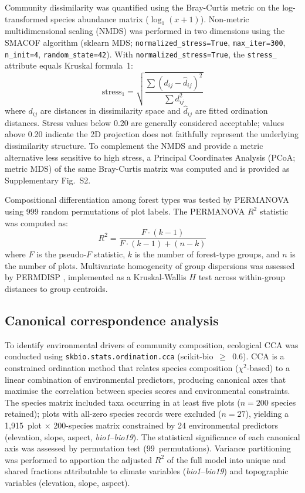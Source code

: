 \documentclass[review,12pt,a4paper]{elsarticle}
\begin{document}
Community dissimilarity was quantified using the Bray-Curtis metric on the
log-transformed species abundance matrix ($\log_1(x+1)$). Non-metric
multidimensional scaling (NMDS) was performed in two dimensions using the
SMACOF algorithm (sklearn MDS; \texttt{normalized\_stress=True},
\texttt{max\_iter=300}, \texttt{n\_init=4}, \texttt{random\_state=42}).
With \texttt{normalized\_stress=True}, the \texttt{stress\_} attribute equals
Kruskal formula~1:
\begin{equation}
  \text{stress}_1 = \sqrt{\frac{\sum (d_{ij} - \hat{d}_{ij})^2}{\sum d_{ij}^2}}
  \label{eq:stress}
\end{equation}
where $d_{ij}$ are distances in dissimilarity space and $\hat{d}_{ij}$ are
fitted ordination distances. Stress values below 0.20 are generally
considered acceptable; values above 0.20 indicate the 2D projection does not
faithfully represent the underlying dissimilarity structure. To complement the
NMDS and provide a metric alternative less sensitive to high stress, a
Principal Coordinates Analysis (PCoA; metric MDS) of the same Bray-Curtis
matrix was computed and is provided as Supplementary Fig.~S2.

Compositional differentiation among forest types was tested by PERMANOVA
\citep{anderson2001} using 999 random permutations of plot labels. The
PERMANOVA $R^2$ statistic was computed as:
\begin{equation}
  R^2 = \frac{F \cdot (k-1)}{F \cdot (k-1) + (n-k)}
  \label{eq:permanova_r2}
\end{equation}
where $F$ is the pseudo-$F$ statistic, $k$ is the number of forest-type
groups, and $n$ is the number of plots. Multivariate homogeneity of group
dispersions was assessed by PERMDISP \citep{anderson2006}, implemented as a
Kruskal-Wallis $H$ test across within-group distances to group centroids.

\subsection{Canonical correspondence analysis}
\label{sec:cca}

To identify environmental drivers of community composition, ecological CCA
\citep{terbraak1986} was conducted using \texttt{skbio.stats.ordination.cca}
(scikit-bio~$\geq$~0.6). CCA is a constrained ordination method that relates
species composition ($\chi^2$-based) to a linear combination of environmental
predictors, producing canonical axes that maximise the correlation between
species scores and environmental constraints. The species matrix included taxa
occurring in at least five plots ($n = 200$ species retained); plots with
all-zero species records were excluded ($n = 27$), yielding a 1{,}915~plot
$\times$ 200-species matrix constrained by 24 environmental predictors
(elevation, slope, aspect, \textit{bio1}--\textit{bio19}). The statistical
significance of each canonical axis was assessed by permutation test
(99~permutations). Variance partitioning \citep{borcard1992} was performed to
apportion the adjusted $R^2$ of the full model into unique and shared
fractions attributable to climate variables (\textit{bio1}--\textit{bio19})
and topographic variables (elevation, slope, aspect).
\end{document}
